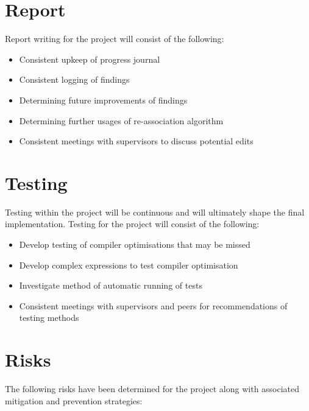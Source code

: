 \documentclass[12pt,openany,a4paper]{book}
\begin{document}
\section{Report}
\label{report}

Report writing for the project will consist of the following:

\begin{itemize}
\item Consistent upkeep of progress journal
\item Consistent logging of findings
\item Determining future improvements of findings
\item Determining further usages of re-association algorithm
\item Consistent meetings with supervisors to discuss potential edits
\end{itemize}

\section{Testing}
\label{testing}

Testing within the project will be continuous and will ultimately shape the
final implementation. Testing for the project will consist of the following:

\begin{itemize}
\item Develop testing of compiler optimisations that may be missed
\item Develop complex expressions to test compiler optimisation
\item Investigate method of automatic running of tests
\item Consistent meetings with supervisors and peers for recommendations of testing methods
\end{itemize}

\section{Risks}
\label{risks}

The following risks have been determined for the project along with associated
mitigation and prevention strategies:
\end{document}
